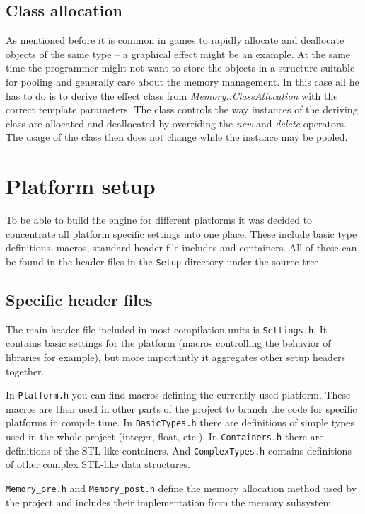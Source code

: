 \documentclass[a4paper, 12pt]{report}
\begin{document}
\section{Class allocation}
As mentioned before it is common in games to rapidly allocate and deallocate objects of the same type -- a graphical effect might be an example. At the same time the programmer might not want to store the objects in a structure suitable for pooling and generally care about the memory management. In this case all he has to do is to derive the effect class from \emph{Memory::ClassAllocation} with the correct template parameters. The class controls the way instances of the deriving class are allocated and deallocated by overriding the \emph{new} and \emph{delete} operators. The usage of the class then does not change while the instance may be pooled.


\chapter{Platform setup}

To be able to build the engine for different platforms it was decided to concentrate all platform specific settings into one place. These include basic type definitions, macros, standard header file includes and containers. All of these can be found in the header files in the \verb/Setup/ directory under the source tree.

\section{Specific header files}
The main header file included in most compilation units is \verb/Settings.h/. It contains basic settings for the platform (macros controlling the behavior of libraries for example), but more importantly it aggregates other setup headers together.

In \verb/Platform.h/ you can find macros defining the currently used platform. These macros are then used in other parts of the project to branch the code for specific platforms in compile time. In \verb/BasicTypes.h/ there are definitions of simple types used in the whole project (integer, float, etc.). In \verb/Containers.h/ there are definitions of the STL-like containers. And \verb/ComplexTypes.h/ contains definitions of other complex STL-like data structures.

\verb/Memory_pre.h/ and \verb/Memory_post.h/ define the memory allocation method used by the project and includes their implementation from the memory subsystem.
\end{document}
